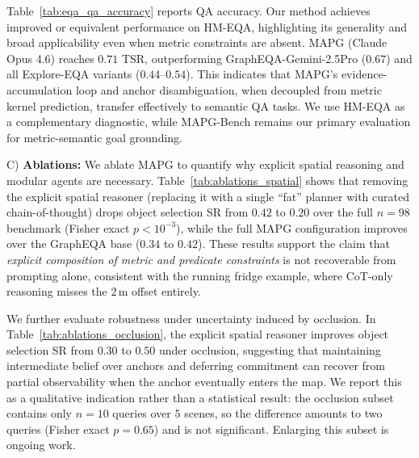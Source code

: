 Table~\ref{tab:eqa_qa_accuracy} reports QA accuracy. Our method achieves improved or equivalent performance on HM-EQA, highlighting its generality and broad applicability even when metric constraints are absent. MAPG (Claude Opus 4.6) reaches $0.71$ TSR, outperforming GraphEQA-Gemini-2.5Pro ($0.67$) and all Explore-EQA variants ($0.44$--$0.54$). This indicates that MAPG's evidence-accumulation loop and anchor disambiguation, when decoupled from metric kernel prediction, transfer effectively to semantic QA tasks. We use HM-EQA as a complementary diagnostic, while MAPG-Bench remains our primary evaluation for metric-semantic goal grounding.

\noindent C) \textbf{Ablations:}
We ablate MAPG to quantify why explicit spatial reasoning and modular agents are necessary. Table~\ref{tab:ablations_spatial} shows that removing the explicit spatial reasoner (replacing it with a single ``fat'' planner with curated chain-of-thought) drops object selection SR from $0.42$ to $0.20$ over the full $n=98$ benchmark (Fisher exact $p<10^{-3}$), while the full MAPG configuration improves over the GraphEQA base ($0.34$ to $0.42$). These results support the claim that \emph{explicit composition of metric and predicate constraints} is not recoverable from prompting alone, consistent with the running fridge example, where CoT-only reasoning misses the $2\,\mathrm{m}$ offset entirely. %

We further evaluate robustness under uncertainty induced by occlusion. In Table~\ref{tab:ablations_occlusion}, the explicit spatial reasoner improves object selection SR from $0.30$ to $0.50$ under occlusion, suggesting that maintaining intermediate belief over anchors and deferring commitment can recover from partial observability when the anchor eventually enters the map. We report this as a qualitative indication rather than a statistical result: the occlusion subset contains only $n=10$ queries over $5$ scenes, so the difference amounts to two queries (Fisher exact $p=0.65$) and is not significant. Enlarging this subset is ongoing work.

